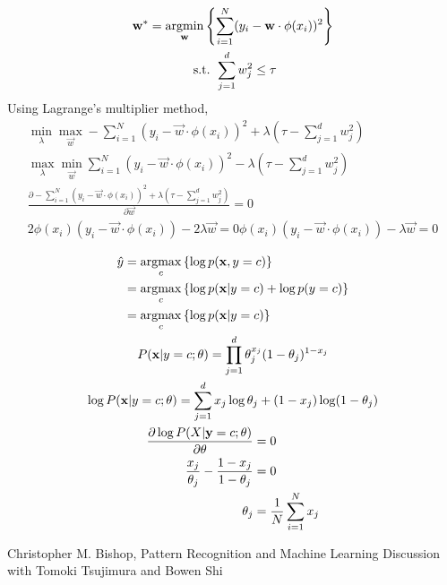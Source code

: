 \documentclass{introtosml}
\newcommand{\x}{\vec{x}}
\newcommand{\w}{\vec{w}}
\newcommand\Lnb{\sum_{i=1}^N (y_i - \w \cdot \phi(x_i))^2}
\newcommand\Lnbl{- \Lnb + \lambda (\tau - \sum_{j=1}^d w_j^2)}
\begin{document}
\maketitle

\begin{p}
  \item
    \begin{gather*}
      \w^* = \argmin_\w \left\{ \sum_{i=1}^N (y_i - \w \cdot \phi(x_i))^2 \right\} \\
      \st \sum_{j=1}^d w_j^2 \le \tau \\
    \end{gather*}
    Using Lagrange's multiplier method,
    \begin{gather*}
      \min_\lambda \max_\w \Lnbl \\
      \max_\lambda \min_\w \Lnb - \lambda (\tau - \sum_{j=1}^d w_j^2) \\
      \frac{\partial \Lnbl}{\partial \w} = 0 \\
      2 \phi(x_i) (y_i - \w \cdot \phi(x_i)) - 2 \lambda \w = 0
      \phi(x_i) (y_i - \w \cdot \phi(x_i)) - \lambda \w = 0
    \end{gather*}

  \item
    \begin{gather*}
      \begin{aligned}
        \hat{y}
        & = \argmax_c \left\{ \log p(\x, y = c) \right\} \\
        & = \argmax_c \left\{ \log p(\x | y = c) + \log p(y = c) \right\} \\
        & = \argmax_c \left\{ \log p(\x | y = c) \right\}
      \end{aligned} \\
      P(\x | y = c; \theta) = \prod_{j=1}^d \theta_j^{x_j} (1 - \theta_j)^{1 - x_j} \\
      \log P(\x | y = c; \theta) = \sum_{j = 1}^d x_j \log \theta_j + (1 - x_j) \log (1 - \theta_j) \\
      \begin{aligned}
        \frac{\partial \log P(X | \vec{y} = c; \theta)}{\partial \theta} & = 0 \\
        \frac{x_j}{\theta_j} - \frac{1 - x_j}{1 - \theta_j} & = 0 \\
        \theta_j & = \frac{1}{N} \sum_{i=1}^N x_j
      \end{aligned}
    \end{gather*}
\end{p}

\begin{thebibliography}{9}
   Christopher M. Bishop, Pattern Recognition and Machine Learning
   Discussion with Tomoki Tsujimura and Bowen Shi
\end{thebibliography}
\end{document}
